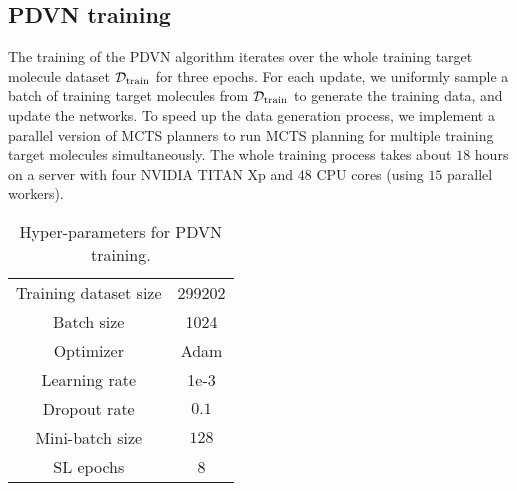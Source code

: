 \documentclass[nohyperref]{article}
\theoremstyle{plain}
\theoremstyle{definition}
\theoremstyle{remark}
\begin{document}
\subsection{PDVN training}

The training of the PDVN algorithm iterates over the whole training target molecule dataset $\mathcal{D}_{\rm train}$ for three epochs. For each update, we uniformly sample a batch of training target molecules from $\mathcal{D}_{\rm train}$ to generate the training data, and update the networks. To speed up the data generation process, we implement a parallel version of MCTS planners to run MCTS planning for multiple training target molecules simultaneously. 
The whole training process takes about $18$ hours on a server with four NVIDIA TITAN Xp and 48 CPU cores
(using $15$ parallel workers).

\begin{table}[h]
\centering
\caption{Hyper-parameters for PDVN training.}
\label{tab:hyper}
\begin{tabular}{cc}
\toprule
Training dataset size & 299202 \\
Batch size & 1024 \\
Optimizer & Adam \\
Learning rate & 1e-3 \\
Dropout rate & $0.1$ \\
Mini-batch size & $128$ \\
SL epochs & 8 \\
\bottomrule
\end{tabular}
\vskip-0.11in
\end{table}
\end{document}
